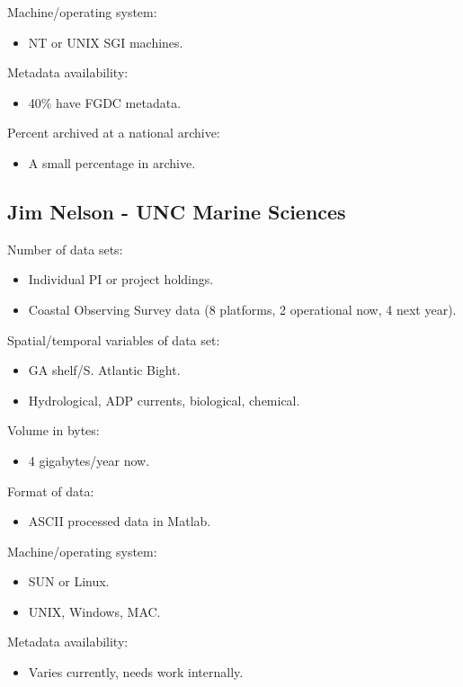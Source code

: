 Machine/operating system:
\begin{itemize}
  \item NT or UNIX SGI machines.
\end{itemize}

Metadata availability:
\begin{itemize}
  \item 40\% have FGDC metadata.
\end{itemize}

Percent archived at a national archive:
\begin{itemize}
  \item A small percentage in archive.
\end{itemize}


\subsection{Jim Nelson - UNC Marine Sciences}

Number of data sets:
\begin{itemize}
  \item Individual PI or project holdings.
  \item Coastal Observing Survey data (8 platforms, 2 operational now, 4 next year).
\end{itemize}

Spatial/temporal variables of data set:
\begin{itemize}
  \item GA shelf/S. Atlantic Bight.
  \item Hydrological, ADP currents, biological, chemical.
\end{itemize}

Volume in bytes:
\begin{itemize}
  \item     4 gigabytes/year now.
\end{itemize}

Format of data:
\begin{itemize}
  \item ASCII processed data in Matlab.
\end{itemize}

Machine/operating system:
\begin{itemize}
  \item SUN or Linux.
  \item UNIX, Windows, MAC.
\end{itemize}

Metadata availability:
\begin{itemize}
  \item Varies currently, needs work internally.
\end{itemize}

